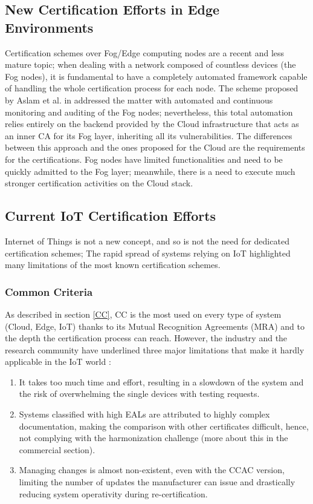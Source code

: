 \subsection{New Certification Efforts in Edge Environments}
Certification schemes over Fog/Edge computing nodes are a recent and less mature topic; when dealing with a network composed of countless devices (the Fog nodes), it is fundamental to have a completely automated framework capable of handling the whole certification process for each node. The scheme proposed by Aslam et al. in \cite{aslam2020fonac} addressed the matter with automated and continuous monitoring and auditing of the Fog nodes; nevertheless, this total automation relies entirely on the backend provided by the Cloud infrastructure that acts as an inner CA for its Fog layer, inheriting all its vulnerabilities. The differences between this approach and the ones proposed for the Cloud are the requirements for the certifications. Fog nodes have limited functionalities and need to be quickly admitted to the Fog layer; meanwhile, there is a need to execute much stronger certification activities on the Cloud stack.

\subsection{Current IoT Certification Efforts}
Internet of Things is not a new concept, and so is not the need for dedicated certification schemes; The rapid spread of systems relying on IoT highlighted many limitations of the most known certification schemes.

\subsubsection{Common Criteria}
As described in section \ref{CC}, CC is the most used on every type of system (Cloud, Edge, IoT) thanks to its Mutual Recognition Agreements (MRA) and to the depth the certification process can reach. However, the industry and the research community have underlined three major limitations that make it hardly applicable in the IoT world \cite{kaluvuri2014quantitative}\cite{keblawi2006applying}:
\begin{enumerate}
    \item It takes too much time and effort, resulting in a slowdown of the system and the risk of overwhelming the single devices with testing requests.
    \item Systems classified with high EALs are attributed to highly complex documentation, making the comparison with other certificates difficult, hence, not complying with the harmonization challenge (more about this in the commercial section).
    \item Managing changes is almost non-existent, even with the CCAC version, limiting the number of updates the manufacturer can issue and drastically reducing system operativity during re-certification.
\end{enumerate}


